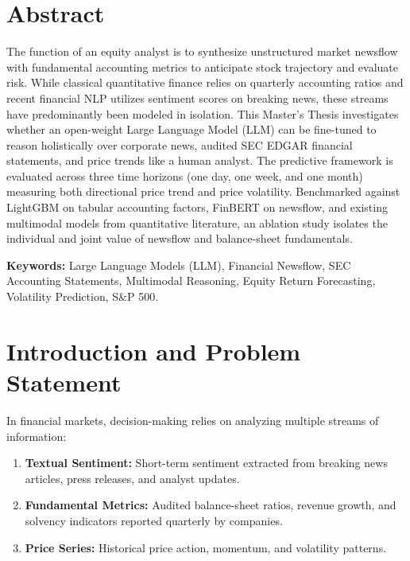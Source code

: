 \documentclass[11pt,a4paper]{article}
\begin{document}
\section{Abstract}
\label{sec:abstract}

The function of an equity analyst is to synthesize unstructured market newsflow with fundamental accounting metrics to anticipate stock trajectory and evaluate risk. While classical quantitative finance relies on quarterly accounting ratios and recent financial NLP utilizes sentiment scores on breaking news, these streams have predominantly been modeled in isolation. This Master's Thesis investigates whether an open-weight Large Language Model (LLM) can be fine-tuned to reason holistically over corporate news, audited SEC EDGAR financial statements, and price trends like a human analyst. The predictive framework is evaluated across three time horizons (one day, one week, and one month) measuring both directional price trend and price volatility. Benchmarked against LightGBM on tabular accounting factors, FinBERT on newsflow, and existing multimodal models from quantitative literature, an ablation study isolates the individual and joint value of newsflow and balance-sheet fundamentals.

\vspace{0.3cm}
\noindent \textbf{Keywords:} Large Language Models (LLM), Financial Newsflow, SEC Accounting Statements, Multimodal Reasoning, Equity Return Forecasting, Volatility Prediction, S\&P 500.

\section{Introduction and Problem Statement}
\label{sec:introduction}

In financial markets, decision-making relies on analyzing multiple streams of information:
\begin{enumerate}[leftmargin=*, label=\bfseries(\alph*)]
    \item \textbf{Textual Sentiment:} Short-term sentiment extracted from breaking news articles, press releases, and analyst updates.
    \item \textbf{Fundamental Metrics:} Audited balance-sheet ratios, revenue growth, and solvency indicators reported quarterly by companies.
    \item \textbf{Price Series:} Historical price action, momentum, and volatility patterns.
\end{enumerate}
\end{document}

